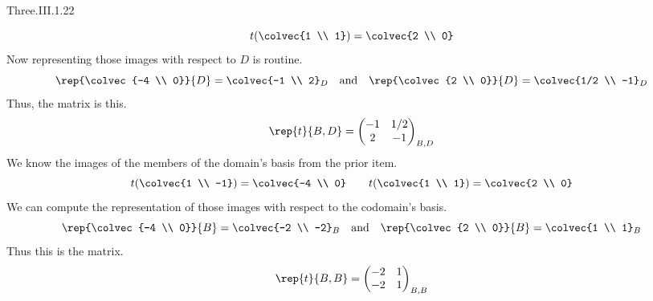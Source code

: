 \begin{ans}{Three.III.1.22}
\begin{exparts}
\begin{equation*}
            t(\colvec{1 \\ 1})=\colvec{2 \\ 0}
          \end{equation*}
          Now representing those images with respect to $D$ is routine.
          \begin{equation*}
            \rep{\colvec{-4 \\ 0}}{D}=\colvec{-1 \\ 2}_D
            \quad\text{and}\quad
            \rep{\colvec{2 \\ 0}}{D}=\colvec{1/2 \\ -1}_D
          \end{equation*}
          Thus, the matrix is this.
          \begin{equation*}
            \rep{t}{B,D}=
            \begin{pmatrix}
              -1  &1/2  \\
               2  &-1
            \end{pmatrix}_{B,D}
          \end{equation*}
        \partsitem We know the images of the members of the domain's basis
          from the prior item.
          \begin{equation*}
             t(\colvec{1 \\ -1})=\colvec{-4 \\ 0}
             \qquad
             t(\colvec{1 \\ 1})=\colvec{2 \\ 0}
          \end{equation*}
          We can  compute the representation of those images with respect to
          the codomain's basis.
          \begin{equation*}
             \rep{\colvec{-4 \\ 0}}{B}=\colvec{-2 \\ -2}_B
             \quad\text{and}\quad
             \rep{\colvec{2 \\ 0}}{B}=\colvec{1 \\ 1}_B
          \end{equation*}
          Thus this is the matrix.
          \begin{equation*}
            \rep{t}{B,B}=
            \begin{pmatrix}
              -2  &1  \\
              -2  &1
            \end{pmatrix}_{B,B}
          \end{equation*}
      \end{exparts}
    
\end{ans}
